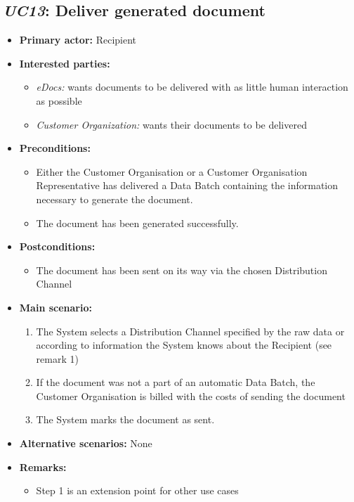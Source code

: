 \documentclass[a4paper,10pt]{article}
\begin{document}
\subsection{\emph{UC13}: Deliver generated document}
\begin{itemize}
    \item \textbf{Primary actor:} Recipient
    \item \textbf{Interested parties:} 
        \begin{itemize}
            \item \textit{eDocs:} wants documents to be delivered with as little human interaction as possible
            \item \textit{Customer Organization:} wants their documents to be delivered
        \end{itemize}

    \item \textbf{Preconditions:}
        \begin{itemize}
            \item Either the Customer Organisation or a Customer Organisation Representative has delivered a Data Batch containing the information necessary to generate the document.
            \item The document has been generated successfully.
        \end{itemize}

    \item \textbf{Postconditions:}
        \begin{itemize}
            \item The document has been sent on its way via the chosen Distribution Channel
        \end{itemize}
        
    \item \textbf{Main scenario:} 
    \begin{enumerate}
       \item The System selects a Distribution Channel specified by the raw data or according to information the System knows about the Recipient (see remark 1)
       \item If the document was not a part of an automatic Data Batch, the Customer Organisation is billed with the costs of sending the document
       \item The System marks the document as sent.
    \end{enumerate}

    \item \textbf{Alternative scenarios:} 
    None
    
    \item \textbf{Remarks:}
        \begin{itemize}
            \item Step 1 is an extension point for other use cases
        \end{itemize}
\end{itemize}
\end{document}
